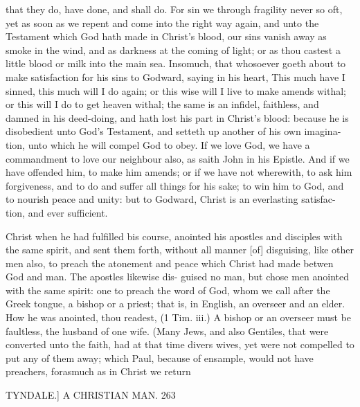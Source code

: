 \documentclass{custom}
\begin{document}
{that they do, have done, and shall do. For sin we through 
fragility never so oft, yet as soon as we repent and come 
into the right way again, and unto the Testament which 
God hath made in Christ's blood, our sins vanish away 
as smoke in the wind, and as darkness at the coming of 
light; or as thou castest a little blood or milk into the main 
sea. Insomuch, that whosoever goeth about to make 
satisfaction for his sins to Godward, saying in his heart, 
This much have I sinned, this much will I do again; or 
this wise will I live to make amends withal; or this will I 
do to get heaven withal; the same is an infidel, faithless, 
and damned in his deed-doing, and hath lost his part in 
Christ's blood: because he is disobedient unto God's 
Testament, and setteth up another of his own imagina- 
tion, unto which he will compel God to obey. If we 
love God, we have a commandment to love our neighbour 
also, as saith John in his Epistle. And if we have offended 
him, to make him amends; or if we have not wherewith, 
to ask him forgiveness, and to do and suffer all things for 
his sake; to win him to God, and to nourish peace and 
unity: but to Godward, Christ is an everlasting satisfac- 
tion, and ever sufficient. 

Christ when he had fulfilled bis course, anointed his 
apostles and disciples with the same spirit, and sent them 
forth, without all manner [of] disguising, like other men 
also, to preach the atonement and peace which Christ had 
made betwen God and man. The apostles likewise dis- 
guised no man, but chose men anointed with the same 
spirit: one to preach the word of God, whom we call 
after the Greek tongue, a bishop or a priest; that is, in 
English, an overseer and an elder. How he was anointed, 
thou readest, (1 Tim. iii.) A bishop or an overseer must 
be faultless, the husband of one wife. (Many Jews, and 
also Gentiles, that were converted unto the faith, had at 
that time divers wives, yet were not compelled to put any 
of them away; which Paul, because of ensample, would 
not have preachers, forasmuch as in Christ we return 


TYNDALE.]
A CHRISTIAN MAN.
263

}
\end{document}
